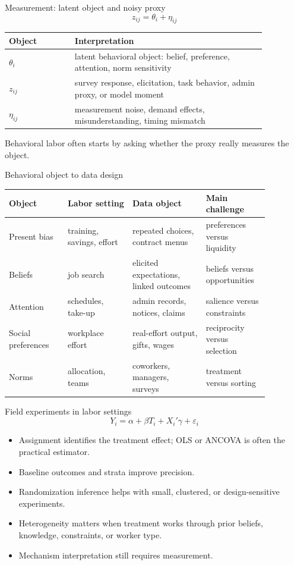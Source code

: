 \documentclass[aspectratio=169,11pt]{beamer}
\begin{document}
\begin{frame}{Measurement: latent object and noisy proxy}
\[
z_{ij} = \theta_i + \eta_{ij}
\]

\small
\begin{tabular}{p{0.22\linewidth} p{0.64\linewidth}}
\toprule
Object & Interpretation \\
\midrule
$\theta_i$ & latent behavioral object: belief, preference, attention, norm sensitivity \\
$z_{ij}$ & survey response, elicitation, task behavior, admin proxy, or model moment \\
$\eta_{ij}$ & measurement noise, demand effects, misunderstanding, timing mismatch \\
\bottomrule
\end{tabular}

\vspace{0.7em}
Behavioral labor often starts by asking whether the proxy really measures the object.
\end{frame}

\begin{frame}{Behavioral object to data design}
\scriptsize
\begin{tabular}{p{0.20\linewidth} p{0.22\linewidth} p{0.25\linewidth} p{0.20\linewidth}}
\toprule
Object & Labor setting & Data object & Main challenge \\
\midrule
Present bias & training, savings, effort & repeated choices, contract menus & preferences versus liquidity \\
Beliefs & job search & elicited expectations, linked outcomes & beliefs versus opportunities \\
Attention & schedules, take-up & admin records, notices, claims & salience versus constraints \\
Social preferences & workplace effort & real-effort output, gifts, wages & reciprocity versus selection \\
Norms & allocation, teams & coworkers, managers, surveys & treatment versus sorting \\
\bottomrule
\end{tabular}
\end{frame}

\begin{frame}{Field experiments in labor settings}
\[
Y_i = \alpha + \beta T_i + X_i'\gamma + \varepsilon_i
\]

\begin{itemize}
    \item Assignment identifies the treatment effect; OLS or ANCOVA is often the practical estimator.
    \item Baseline outcomes and strata improve precision.
    \item Randomization inference helps with small, clustered, or design-sensitive experiments.
    \item Heterogeneity matters when treatment works through prior beliefs, knowledge, constraints, or worker type.
    \item Mechanism interpretation still requires measurement.
\end{itemize}
\end{frame}
\end{document}
